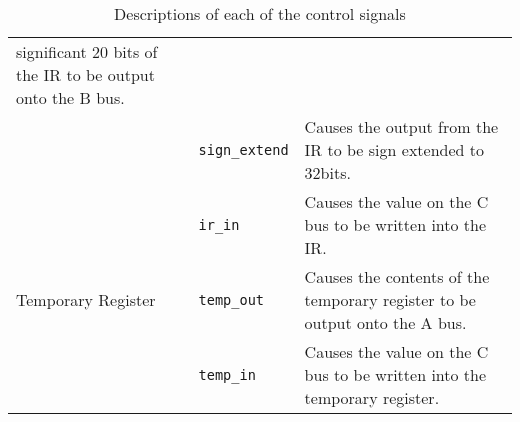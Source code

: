 \documentclass[a4paper,10pt]{article}
\begin{document}
\begin{table}[h]
\begin{center}
\begin{tabular}{|l|l|p{8cm}|}
significant 20 bits of the IR to be output onto the B bus. \\
\cline{2-3}
& \texttt{sign\_extend} & Causes the output from the IR to be sign
extended to 32bits. \\
\cline{2-3}
& \texttt{ir\_in} & Causes the value on the C bus to be written into
the IR. \\
\hline
Temporary Register & \texttt{temp\_out} & Causes the contents of the
temporary register to be output onto the A bus. \\
\cline{2-3}
& \texttt{temp\_in} & Causes the value on the C bus to be written into
the temporary register. \\
\hline
\end{tabular}
\end{center}
\caption{Descriptions of each of the control signals}
\label{table:signals}
\end{table}
\newpage
\end{document}
